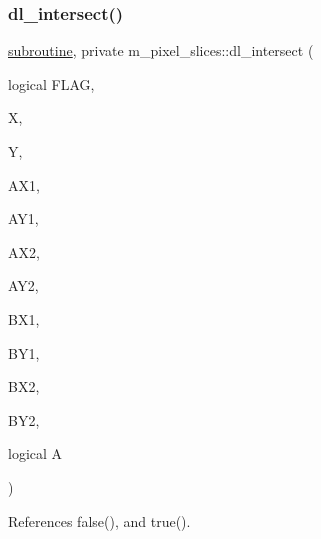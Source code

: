 \subsubsection{\texorpdfstring{dl\+\_\+intersect()}{dl\_intersect()}}
{\footnotesize\ttfamily \hyperlink{M__stopwatch_83_8txt_acfbcff50169d691ff02d4a123ed70482}{subroutine}, private m\+\_\+pixel\+\_\+slices\+::dl\+\_\+intersect (\begin{DoxyParamCaption}\item[{logical}]{F\+L\+AG,  }\item[{}]{X,  }\item[{}]{Y,  }\item[{}]{A\+X1,  }\item[{}]{A\+Y1,  }\item[{}]{A\+X2,  }\item[{}]{A\+Y2,  }\item[{}]{B\+X1,  }\item[{}]{B\+Y1,  }\item[{}]{B\+X2,  }\item[{}]{B\+Y2,  }\item[{logical}]{A }\end{DoxyParamCaption})\hspace{0.3cm}{\ttfamily [private]}}



References false(), and true().

